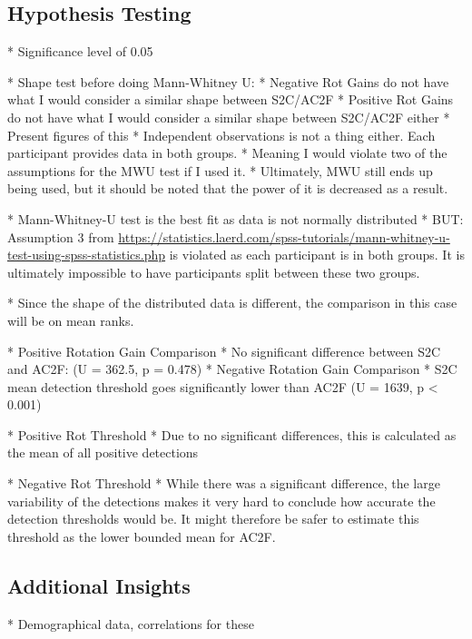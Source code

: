 \subsection{Hypothesis Testing}
* Significance level of 0.05

* Shape test before doing Mann-Whitney U:
   * Negative Rot Gains do not have what I would consider a similar shape between S2C/AC2F
   * Positive Rot Gains do not have what I would consider a similar shape between S2C/AC2F either
   * Present figures of this
* Independent observations is not a thing either. Each participant provides data in both groups. 
* Meaning I would violate two of the assumptions for the MWU test if I used it.
* Ultimately, MWU still ends up being used, but it should be noted that the power of it is decreased as a result. 

* Mann-Whitney-U test is the best fit as data is not normally distributed
   * BUT: Assumption 3 from \url{https://statistics.laerd.com/spss-tutorials/mann-whitney-u-test-using-spss-statistics.php} is violated as each participant is in both groups. It is ultimately impossible to have participants split between these two groups. 

* Since the shape of the distributed data is different, the comparison in this case will be on mean ranks. 

* Positive Rotation Gain Comparison
   * No significant difference between S2C and AC2F: (U = 362.5, p = 0.478)
* Negative Rotation Gain Comparison
   * S2C mean detection threshold goes significantly lower than AC2F (U = 1639, p < 0.001)
   
* Positive Rot Threshold
   * Due to no significant differences, this is calculated as the mean of all positive detections
   
* Negative Rot Threshold
   * While there was a significant difference, the large variability of the detections makes it very hard to conclude how accurate the detection thresholds would be. It might therefore be safer to estimate this threshold as the lower bounded mean for AC2F.

\subsection{Additional Insights}
* Demographical data, correlations for these

